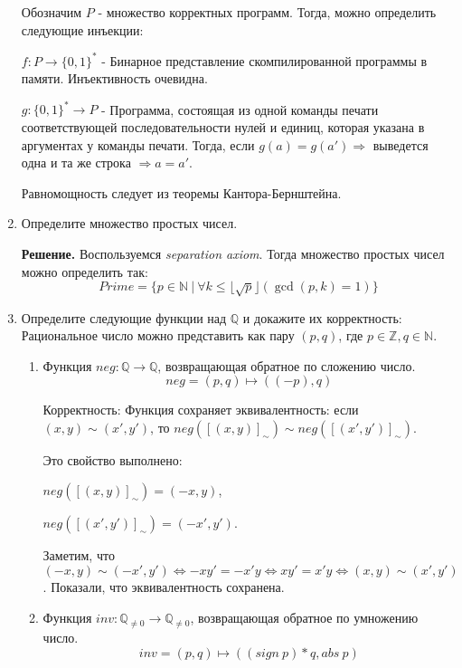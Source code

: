 \begin{enumerate}
Обозначим $P$ - множество корректных программ. Тогда, можно определить следующие инъекции:

$f:P \rightarrow \{0,1\}^*$ - Бинарное представление скомпилированной программы в памяти. Инъективность очевидна.


$g:\{0,1\}^* \rightarrow P$ - Программа, состоящая из одной команды печати соответствующей 
последовательности нулей и единиц, которая указана в аргументах у команды печати. Тогда, если 
$g(a) = g(a') \Rightarrow $ выведется одна и та же строка $\Rightarrow a = a'$. 

Равномощность следует из теоремы Кантора-Бернштейна.

\item Определите множество простых чисел.

\textbf{Решение.} Воспользуемся \textit{separation axiom}. Тогда множество простых чисел можно определить так:
\begin{equation*}
	Prime = \{p \in \mathbb{N} \ | \ \forall k \leqslant \lfloor \sqrt{p} \rfloor (\gcd(p, k) = 1) \}
\end{equation*}

\item Определите следующие функции над $\mathbb{Q}$ и докажите их корректность:
Рациональное число можно представить как пару $(p, q)$, где $p \in \mathbb{Z}, q \in \mathbb{N}$. 
\begin{enumerate}
\item Функция $neg : \mathbb{Q} \to \mathbb{Q}$, возвращающая обратное по сложению число.
\begin{equation*}
	neg = (p, q) \mapsto ((-p), q)
\end{equation*}

Корректность: Функция сохраняет эквивалентность: если $(x,y) \sim (x',y')$, то $neg([(x,y)]_\sim) 
\sim neg([(x',y')]_\sim)$. 

Это свойство выполнено: 

$neg([(x,y)]_\sim) = (-x, y)$, 

$neg([(x',y')]_\sim) = (-x', y')$. 

Заметим, что $(-x, y) \sim (-x', y') \Leftrightarrow -xy' = -x'y 
\Leftrightarrow xy' = x'y \Leftrightarrow (x,y) \sim (x',y')$. Показали, что эквивалентность 
сохранена.

\item Функция $inv : \mathbb{Q}_{\neq 0} \to \mathbb{Q}_{\neq 0}$, возвращающая обратное по умножению число.
\begin{equation*}
	inv = (p, q) \mapsto ((sign \ p) * q, abs \ p)
\end{equation*}


\end{enumerate}
\end{enumerate}
